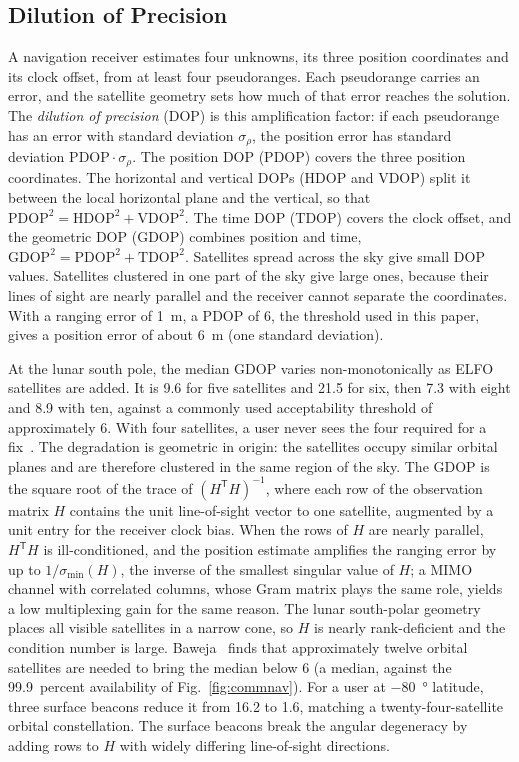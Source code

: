 \documentclass{IEEEoj}
\begin{document}
\subsection{Dilution of Precision}
\label{sec:dop}
A navigation receiver estimates four unknowns, its three position coordinates and its clock offset, from at least four pseudoranges. Each pseudorange carries an error, and the satellite geometry sets how much of that error reaches the solution. The \emph{dilution of precision} (DOP) is this amplification factor: if each pseudorange has an error with standard deviation $\sigma_\rho$, the position error has standard deviation $\mathrm{PDOP}\cdot\sigma_\rho$. The position DOP (PDOP) covers the three position coordinates. The horizontal and vertical DOPs (HDOP and VDOP) split it between the local horizontal plane and the vertical, so that $\mathrm{PDOP}^2=\mathrm{HDOP}^2+\mathrm{VDOP}^2$. The time DOP (TDOP) covers the clock offset, and the geometric DOP (GDOP) combines position and time, $\mathrm{GDOP}^2=\mathrm{PDOP}^2+\mathrm{TDOP}^2$. Satellites spread across the sky give small DOP values. Satellites clustered in one part of the sky give large ones, because their lines of sight are nearly parallel and the receiver cannot separate the coordinates. With a ranging error of \SI{1}{m}, a PDOP of 6, the threshold used in this paper, gives a position error of about \SI{6}{m} (one standard deviation).

At the lunar south pole, the median GDOP varies non-monotonically as ELFO satellites are added. It is 9.6 for five satellites and 21.5 for six, then 7.3 with eight and 8.9 with ten, against a commonly used acceptability threshold of approximately 6. With four satellites, a user never sees the four required for a fix~\cite{baweja_dop}. The degradation is geometric in origin: the satellites occupy similar orbital planes and are therefore clustered in the same region of the sky. The GDOP is the square root of the trace of $(H^{\mathsf{T}}H)^{-1}$, where each row of the observation matrix $H$ contains the unit line-of-sight vector to one satellite, augmented by a unit entry for the receiver clock bias. When the rows of $H$ are nearly parallel, $H^{\mathsf{T}}H$ is ill-conditioned, and the position estimate amplifies the ranging error by up to $1/\sigma_{\min}(H)$, the inverse of the smallest singular value of $H$; a MIMO channel with correlated columns, whose Gram matrix plays the same role, yields a low multiplexing gain for the same reason. The lunar south-polar geometry places all visible satellites in a narrow cone, so $H$ is nearly rank-deficient and the condition number is large. Baweja~\cite{baweja_dop} finds that approximately twelve orbital satellites are needed to bring the median below 6 (a median, against the 99.9~percent availability of Fig.~\ref{fig:commnav}). For a user at \SI{-80}{\degree} latitude, three surface beacons reduce it from 16.2 to 1.6, matching a twenty-four-satellite orbital constellation. The surface beacons break the angular degeneracy by adding rows to $H$ with widely differing line-of-sight directions.
\end{document}
